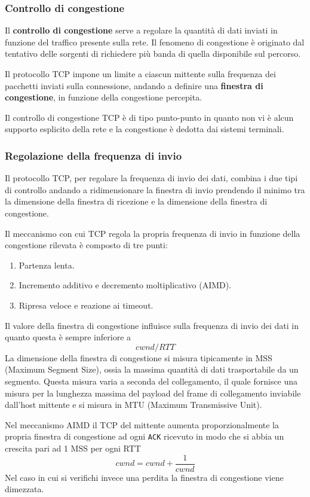 \subsubsection{Controllo di congestione}
Il \textbf{controllo di congestione} serve a regolare la quantità di 
dati inviati in funzione del traffico presente sulla rete. Il fenomeno
di congestione è originato dal tentativo delle sorgenti di richiedere 
più banda di quella disponibile sul percorso.

Il protocollo TCP impone un limite a ciascun mittente sulla frequenza 
dei pacchetti inviati sulla connessione, andando a definire una 
\textbf{finestra di congestione}, in funzione della congestione 
percepita.

Il controllo di congestione TCP è di tipo punto-punto in quanto non 
vi è alcun supporto esplicito della rete e la congestione è dedotta dai
sistemi terminali.

\subsubsection{Regolazione della frequenza di invio}
Il protocollo TCP, per regolare la frequenza di invio dei dati, combina
i due tipi di controllo andando a ridimensionare la finestra di invio 
prendendo il minimo tra la dimensione della finestra di ricezione e la 
dimensione della finestra di congestione.

Il meccanismo con cui TCP regola la propria frequenza di invio in 
funzione della congestione rilevata è composto di tre punti:
\begin{enumerate}
	\item Partenza lenta.
	\item Incremento additivo e decremento moltiplicativo (AIMD).
	\item Ripresa veloce e reazione ai timeout.
\end{enumerate}
Il valore della finestra di congestione influisce sulla frequenza di 
invio dei dati in quanto questa è sempre inferiore a
\[ cwnd / RTT \]
La dimensione della finestra di congestione si misura tipicamente in 
MSS (Maximum Segment Size), ossia la massima quantità di dati 
trasportabile da un segmento. Questa misura varia a seconda del
collegamento, il quale fornisce una misura per la lunghezza massima del
payload del frame di collegamento inviabile dall'host mittente e si 
misura in MTU (Maximum Transmissive Unit).

Nel meccanismo AIMD il TCP del mittente aumenta proporzionalmente la 
propria finestra di congestione ad ogni \verb|ACK| ricevuto in modo che
si abbia un crescita pari ad 1 MSS per ogni RTT
\[ cwnd = cwnd + \frac{1}{cwnd} \]
Nel caso in cui si verifichi invece una perdita la finestra di 
congestione viene dimezzata.


